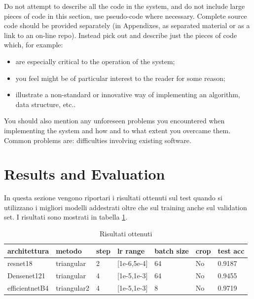 Do not attempt to describe all the code in the system, and do not include large pieces of code in this section, use pseudo-code where necessary. Complete source code should be provided separately (in Appendixes, as separated material or as a link to an on-line repo). Instead pick out and describe just the pieces of code which, for example:
\begin{itemize}
\item are especially critical to the operation of the system;
\item you feel might be of particular interest to the reader for some reason;
\item  illustrate a non-standard or innovative way of implementing an algorithm, data
structure, etc..
\end{itemize}

You should also mention any unforeseen problems you encountered when implementing the
system and how and to what extent you overcame them. Common problems are:
 difficulties involving existing software.


\section{Results and Evaluation}
In questa sezione vengono riportari i risultati ottenuti sul test quando si utilizzano i migliori modelli addestrati oltre che sul training anche sul validation set. I risultati sono mostrati in tabella \ref{t_res}.
\begin{table}[H]
\centering
\caption{Risultati ottenuti}
\begin{tabular}{|l|l|l|l|l|l|l|}
\hline
architettura   & metodo      & step & lr range        & batch size & crop & test acc \\ \hline
resnet18       & triangular  & 2    & {[}1e-6,5e-4{]} & 64         & No   & 0.9187   \\ \hline
Densenet121    & triangular  & 4    & {[}1e-5,1e-3{]} & 64         & No   & 0.9455   \\ \hline
efficientnetB4 & triangular2 & 4    & {[}1e-5,1e-3{]} & 8          & No   & 0.9719   \\ \hline
\end{tabular}
\label{t_res}
\end{table}

